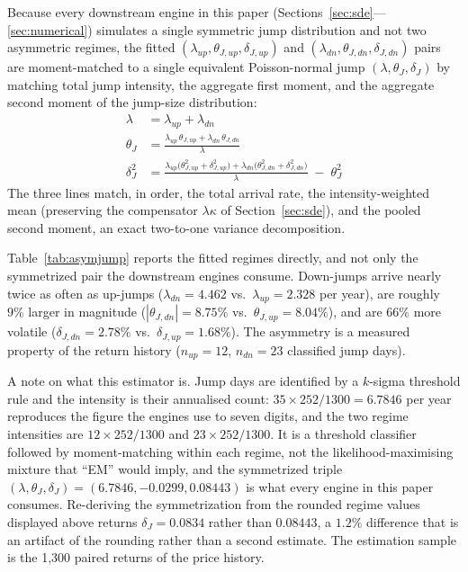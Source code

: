 \documentclass[11pt,a4paper]{article}
\begin{document}
Because every downstream engine in this paper (Sections~\ref{sec:sde}---\ref{sec:numerical}) simulates a single symmetric jump distribution and not two asymmetric regimes, the fitted $(\lambda_{up},\theta_{J,up},\delta_{J,up})$ and $(\lambda_{dn},\theta_{J,dn},\delta_{J,dn})$ pairs are moment-matched to a single equivalent Poisson-normal jump $(\lambda,\theta_J,\delta_J)$ by matching total jump intensity, the aggregate first moment, and the aggregate second moment of the jump-size distribution:
\begin{align}
\lambda &= \lambda_{up}+\lambda_{dn} \\
\theta_J &= \frac{\lambda_{up}\,\theta_{J,up} + \lambda_{dn}\,\theta_{J,dn}}{\lambda} \\
\delta_J^2 &= \frac{\lambda_{up}\big(\theta_{J,up}^2+\delta_{J,up}^2\big) + \lambda_{dn}\big(\theta_{J,dn}^2+\delta_{J,dn}^2\big)}{\lambda} \;-\; \theta_J^2
\end{align}
The three lines match, in order, the total arrival rate, the intensity-weighted mean (preserving the compensator $\lambda\kappa$ of Section~\ref{sec:sde}), and the pooled second moment, an exact two-to-one variance decomposition.

Table~\ref{tab:asymjump} reports the fitted regimes directly, and not only the symmetrized pair the downstream engines consume. Down-jumps arrive nearly twice as often as up-jumps ($\lambda_{dn}=4.462$ vs.\ $\lambda_{up}=2.328$ per year), are roughly $9\%$ larger in magnitude ($|\theta_{J,dn}|=8.75\%$ vs.\ $\theta_{J,up}=8.04\%$), and are 66\% more volatile ($\delta_{J,dn}=2.78\%$ vs.\ $\delta_{J,up}=1.68\%$). The asymmetry is a measured property of the return history ($n_{up}=12$, $n_{dn}=23$ classified jump days).

A note on what this estimator is. Jump days are identified by a $k$-sigma threshold rule and the intensity is their annualised count: $35\times252/1300=6.7846$ per year reproduces the figure the engines use to seven digits, and the two regime intensities are $12\times252/1300$ and $23\times252/1300$. It is a threshold classifier followed by moment-matching within each regime, not the likelihood-maximising mixture that ``EM'' would imply, and the symmetrized triple $(\lambda,\theta_J,\delta_J)=(6.7846,-0.0299,0.08443)$ is what every engine in this paper consumes. Re-deriving the symmetrization from the rounded regime values displayed above returns $\delta_J=0.0834$ rather than $0.08443$, a $1.2\%$ difference that is an artifact of the rounding rather than a second estimate. The estimation sample is the 1{,}300 paired returns of the price history.
\end{document}
